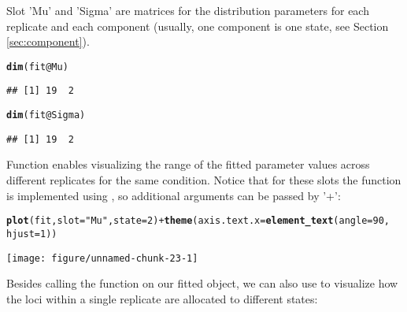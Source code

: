 \documentclass[a4paper,10pt]{article}\usepackage[]{graphicx}\usepackage[]{color}
\makeatletter
\def\maxwidth{ %
  \ifdim\Gin@nat@width>\linewidth
    \linewidth
  \else
    \Gin@nat@width
  \fi
}
\newcommand{\hlnum}[1]{\textcolor[rgb]{0.686,0.059,0.569}{#1}}%
\newcommand{\hlstr}[1]{\textcolor[rgb]{0.192,0.494,0.8}{#1}}%
\newcommand{\hlopt}[1]{\textcolor[rgb]{0,0,0}{#1}}%
\newcommand{\hlstd}[1]{\textcolor[rgb]{0.345,0.345,0.345}{#1}}%
\newcommand{\hlkwc}[1]{\textcolor[rgb]{0.333,0.667,0.333}{#1}}%
\newcommand{\hlkwd}[1]{\textcolor[rgb]{0.737,0.353,0.396}{\textbf{#1}}}%
\newenvironment{kframe}{%
 \def\at@end@of@kframe{}%
 \ifinner\ifhmode%
  \def\at@end@of@kframe{\end{minipage}}%
  \begin{minipage}{\columnwidth}%
 \fi\fi%
 \def\FrameCommand##1{\hskip\@totalleftmargin \hskip-\fboxsep
 \colorbox{shadecolor}{##1}\hskip-\fboxsep
     \hskip-\linewidth \hskip-\@totalleftmargin \hskip\columnwidth}%
 \MakeFramed {\advance\hsize-\width
   \@totalleftmargin\z@ \linewidth\hsize
   \@setminipage}}%
 {\par\unskip\endMakeFramed%
 \at@end@of@kframe}
\newenvironment{knitrout}{}{} %
\makeatother
\begin{document}
Slot 'Mu' and 'Sigma' are matrices for the distribution parameters for each replicate and each component (usually, one component is one state, see Section \ref{sec:component}).

\begin{knitrout}
\color{fgcolor}\begin{kframe}
\begin{alltt}
\hlkwd{dim}\hlstd{(fit}\hlopt{@}\hlkwc{Mu}\hlstd{)}
\end{alltt}
\begin{verbatim}
## [1] 19  2
\end{verbatim}
\begin{alltt}
\hlkwd{dim}\hlstd{(fit}\hlopt{@}\hlkwc{Sigma}\hlstd{)}
\end{alltt}
\begin{verbatim}
## [1] 19  2
\end{verbatim}
\end{kframe}
\end{knitrout}

Function  enables visualizing the range of the fitted parameter values across different replicates for the same condition. Notice that for these slots the function is implemented using , so additional arguments can be passed by '+':

\begin{knitrout}
\color{fgcolor}\begin{kframe}
\begin{alltt}
\hlkwd{plot}\hlstd{(fit,} \hlkwc{slot} \hlstd{=} \hlstr{"Mu"}\hlstd{,} \hlkwc{state} \hlstd{=} \hlnum{2}\hlstd{)} \hlopt{+} \hlkwd{theme}\hlstd{(}\hlkwc{axis.text.x} \hlstd{=} \hlkwd{element_text}\hlstd{(}\hlkwc{angle} \hlstd{=} \hlnum{90}\hlstd{,}
    \hlkwc{hjust} \hlstd{=} \hlnum{1}\hlstd{))}
\end{alltt}
\end{kframe}

{\centering \texttt{[image: figure/unnamed-chunk-23-1]} 

}



\end{knitrout}

Besides calling the  function on our fitted object, we can also use  to visualize how the loci within a single replicate are allocated to different states:
\end{document}
